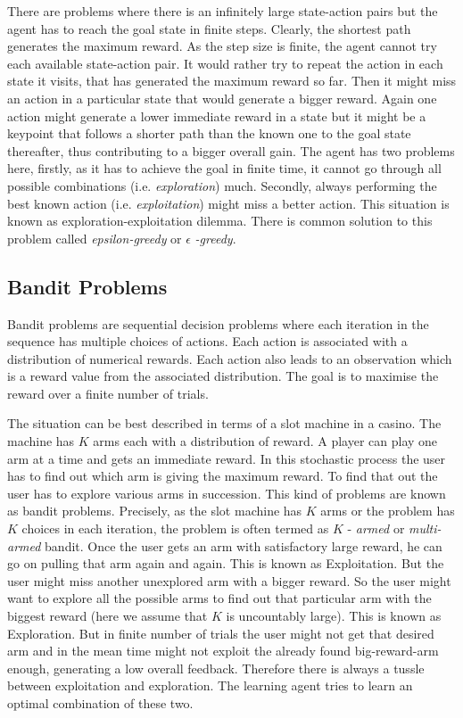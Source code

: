 \documentclass[english]{tktltiki}
\begin{document}
There are problems where there is an infinitely large state-action pairs but the agent has to reach the goal state in finite steps. Clearly, the shortest path generates the maximum reward. As the step size is finite, the agent cannot try each available state-action pair. It would rather try to repeat the action in each state it visits, that has generated the maximum reward so far. Then it might miss an action in a particular state that would generate a bigger reward. Again one action might generate a lower immediate reward in a state but it might be a keypoint that follows a shorter path than the known one to the goal state thereafter, thus contributing to a bigger overall gain. The agent has two problems here, firstly, as it has to achieve the goal in finite time, it cannot go through all possible combinations (i.e. \textit{exploration}) much. Secondly, always performing the best known action (i.e. \textit{exploitation}) might miss a better action. This situation is known as exploration-exploitation \cite{reinforcement_learning} dilemma. There is common solution to this problem called \textit{epsilon-greedy} or $\epsilon$ \textit{-greedy}.

\subsection{Bandit Problems}

Bandit problems \cite{contextual_bandits} are sequential decision problems where each iteration in the sequence has multiple choices of actions. Each action is associated with a distribution of numerical rewards. Each action also leads to an observation which is a reward value from the associated distribution. The goal is to maximise the reward over a finite number of trials. 

The situation can be best described in terms of a slot machine in a casino. The machine has $K$ arms each with a distribution of reward. A player can play one arm at a time and gets an immediate reward. In this stochastic process the user has to find out which arm is giving the maximum reward. To find that out the user has to explore various arms in succession. This kind of problems are known as bandit problems. Precisely, as the slot machine has $K$ arms or the problem has $K$ choices in each iteration, the problem is often termed as $K$ - \textit{armed} or \textit{multi-armed} bandit. Once the user gets an arm with satisfactory large reward, he can go on pulling that arm again and again. This is known as Exploitation. But the user might miss another unexplored arm with a bigger reward. So the user might want to explore all the possible arms to find out that particular arm with the biggest reward (here we assume that $K$ is uncountably large). This is known as Exploration. But in finite number of trials the user might not get that desired arm and in the mean time might not exploit the already found big-reward-arm enough, generating a low overall feedback. Therefore there is always a tussle between exploitation and exploration. The learning agent tries to learn an optimal combination of these two.
\end{document}
